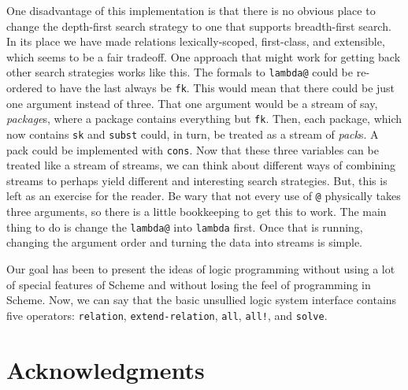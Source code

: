 One disadvantage of this implementation is that there is no obvious place
to change the depth-first search strategy to one that supports
breadth-first search.  In its place we have made relations
lexically-scoped, first-class, and extensible, which seems to be a fair
tradeoff.  One approach that might work for getting back other search
strategies works like this.  The formals to \texttt{lambda@} could be
re-ordered to have the last always be \texttt{fk}.  This would mean that
there could be just one argument instead of three.  That one argument would
be a stream of say, \emph{package}s, where a package contains everything
but \texttt{fk}.  Then, each package, which now contains \texttt{sk} and
\texttt{subst} could, in turn, be treated as a stream of \emph{pack}s.  A
pack could be implemented with \texttt{cons}.  Now that these three
variables can be treated like a stream of streams, we can think about
different ways of combining streams to perhaps yield different and
interesting search strategies.  But, this is left as an exercise for the
reader.  Be wary that not every use of \texttt{@} physically takes three
arguments, so there is a little bookkeeping to get this to work.  The main
thing to do is change the \texttt{lambda@} into \texttt{lambda} first.
Once that is running, changing the argument order and turning the data into
streams is simple.

Our goal has been to present the ideas of logic programming without
using a lot of special features of Scheme and without losing the feel
of programming in Scheme.  Now, we can say that the basic unsullied
logic system interface contains five operators: \texttt{relation},
\texttt{extend-relation}, \texttt{all}, \texttt{all!}, and
\texttt{solve}.
\section{Acknowledgments}

